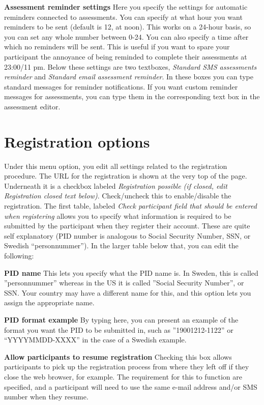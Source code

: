 \documentclass[
]{book}
\begin{document}
\textbf{Assessment reminder settings}
Here you specify the settings for automatic reminders connected to assessments. You can specify at what hour you want reminders to be sent (default is 12, at noon). This works on a 24-hour basis, so you can set any whole number between 0-24.
You can also specify a time after which no reminders will be sent. This is useful if you want to spare your participant the annoyance of being reminded to complete their assessments at 23:00/11 pm.
Below these settings are two textboxes, \emph{Standard SMS assessments reminder} and \emph{Standard email assessment reminder}. In these boxes you can type standard messages for reminder notifications. If you want custom reminder messages for assessments, you can type them in the corresponding text box in the assessment editor.

\chapter{Registration options}\label{registration-options}

Under this menu option, you edit all settings related to the registration procedure. The URL for the registration is shown at the very top of the page. Underneath it is a checkbox labeled \emph{Registration possible (if closed, edit Registration closed text below)}. Check/uncheck this to enable/disable the registration.
The first table, labeled \emph{Check participant field that should be entered when registering} allows you to specify what information is required to be submitted by the participant when they register their account. These are quite self explanatory (PID number is analogous to Social Security Number, SSN, or Swedish ``personnummer'').
In the larger table below that, you can edit the following:

\textbf{PID name}
This lets you specify what the PID name is. In Sweden, this is called ''personnummer'' whereas in the US it is called ''Social Security Number'', or SSN. Your country may have a different name for this, and this option lets you assign the appropriate name.

\textbf{PID format example}
By typing here, you can present an example of the format you want the PID to be submitted in, such as ''19001212-1122'' or ``YYYYMMDD-XXXX'' in the case of a Swedish example.

\textbf{Allow participants to resume registration}
Checking this box allows participants to pick up the registration process from where they left off if they close the web browser, for example. The requirement for this to function are specified, and a participant will need to use the same e-mail address and/or SMS number when they resume.
\end{document}
